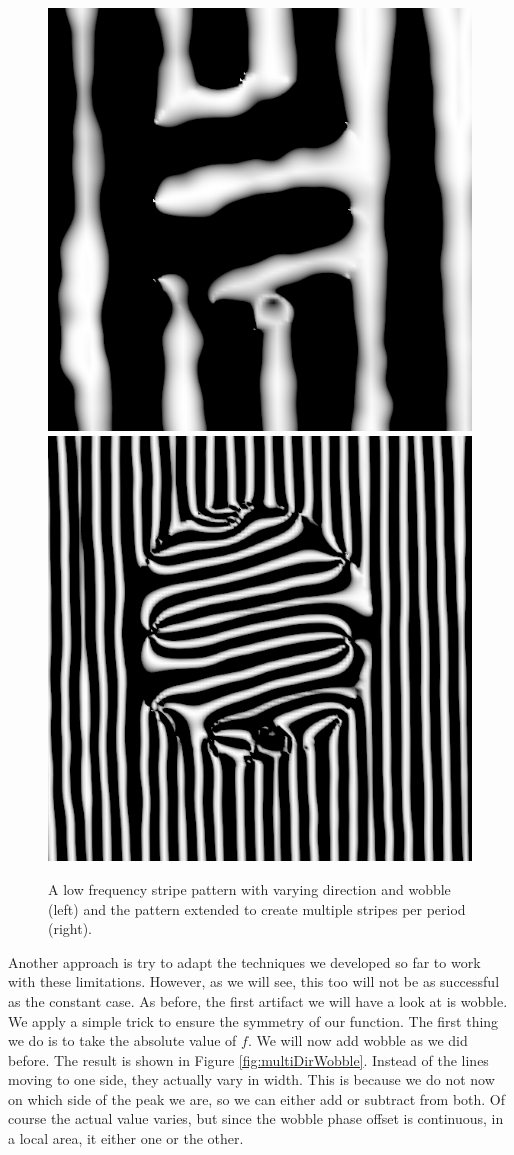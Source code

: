 \documentclass{utue} %
\begin{document}
\begin{figure}[ht]
  \centering
  \includegraphics[width=0.45\linewidth]{images/multiStripe}
  \includegraphics[width=0.45\linewidth]{images/multiStripeMulti}
  \caption{A low frequency stripe pattern with varying direction and wobble (left) and the pattern extended to create multiple stripes per period (right).}\label{fig:multiStripe}
\end{figure}

Another approach is try to adapt the techniques we developed so far to work with these limitations. However, as we will see, this too will not be as successful as the constant case. As before, the first artifact we will have a look at is wobble. We apply a simple trick to ensure the symmetry of our function. The first thing we do is to take the absolute value of $f$. We will now add wobble as we did before. The result is shown in Figure \ref{fig:multiDirWobble}. Instead of the lines moving to one side, they actually vary in width. This is because we do not now on which side of the peak we are, so we can either add or subtract from both. Of course the actual value varies, but since the wobble phase offset is continuous, in a local area, it either one or the other.
\end{document}
